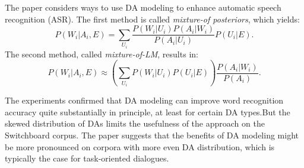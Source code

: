 The paper considers ways to use DA modeling to enhance automatic speech recognition (ASR). The first method is called \emph{mixture-of posteriors}, which yields:
$$P(W_i | A_i, E) = \sum_{U_i} \frac{P(W_i | U_i) P(A_i | W_i)}{P(A_i | U_i)} P(U_i | E).$$
The second method, called \emph{mixture-of-LM}, results in:
$$P(W_i | A_i, E) \approx (\sum_{U_i} P(W_i | U_i) P(U_i|E)) \frac{P(A_i |W_i)}{P(A_i)}.$$

The experiments confirmed that DA modeling can improve word recognition accuracy quite substantially in principle, at least for certain DA types.But the skewed distribution of DAs limits the usefulness of the approach on the Switchboard corpus. The paper suggests that the benefits of DA modeling might be more pronounced on corpora with more even DA distribution, which is typically the case for task-oriented dialogues.
